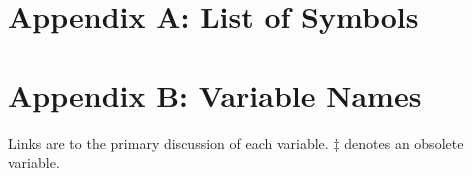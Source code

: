 \documentclass[
]{book}
\begin{document}
\hypertarget{appendix-a-list-of-symbols}{%
\chapter*{Appendix A: List of Symbols}\label{appendix-a-list-of-symbols}}

\hypertarget{appendix-b-variable-names}{%
\chapter*{Appendix B: Variable Names}\label{appendix-b-variable-names}}

Links are to the primary discussion of each variable. \(\ddagger\) denotes an obsolete variable.
\end{document}
